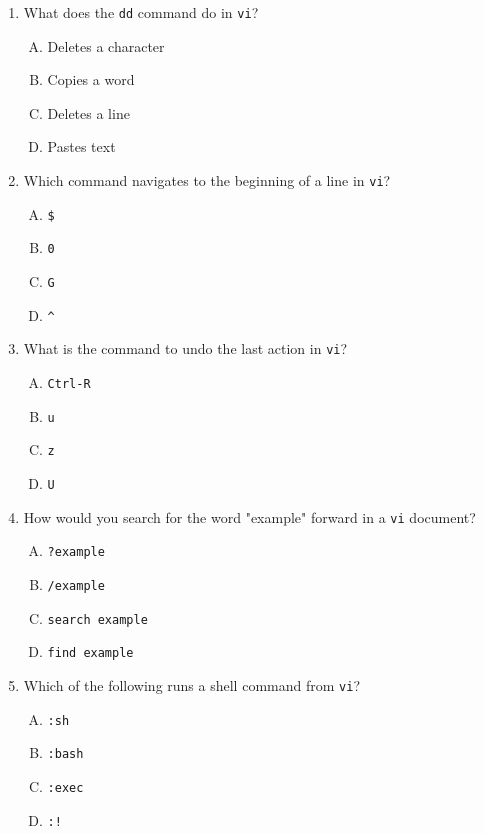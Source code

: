 \documentclass[a4paper]{report}
\begin{document}
\begin{enumerate}[1.]
    \item What does the \texttt{dd} command do in \texttt{vi}?  
    \begin{enumerate}[A)]
        \item Deletes a character  
        \item Copies a word  
        \item Deletes a line  
        \item Pastes text  
    \end{enumerate}

    \item Which command navigates to the beginning of a line in \texttt{vi}?  
    \begin{enumerate}[A)]
        \item \texttt{\$}  
        \item \texttt{0}  
        \item \texttt{G}  
        \item \texttt{\^}  
    \end{enumerate}

    \item What is the command to undo the last action in \texttt{vi}?  
    \begin{enumerate}[A)]
        \item \texttt{Ctrl-R}  
        \item \texttt{u}  
        \item \texttt{z}  
        \item \texttt{U}  
    \end{enumerate}

    \item How would you search for the word "example" forward in a \texttt{vi} document?  
    \begin{enumerate}[A)]
        \item \texttt{?example}  
        \item \texttt{/example}  
        \item \texttt{search example}  
        \item \texttt{find example}  
    \end{enumerate}

    \item Which of the following runs a shell command from \texttt{vi}?  
    \begin{enumerate}[A)]
        \item \texttt{:sh}  
        \item \texttt{:bash}  
        \item \texttt{:exec}  
        \item \texttt{:!}  
    \end{enumerate}


\end{enumerate}
\end{document}
